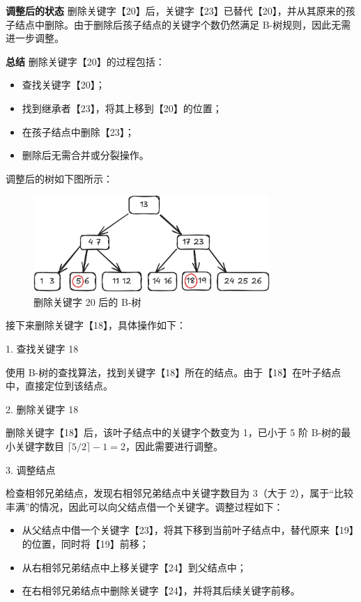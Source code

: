 \documentclass[lang=cn,newtx,10pt,scheme=chinese]{../elegantbook}
\begin{document}
     
     \textbf{调整后的状态}  
     删除关键字【20】后，关键字【23】已替代【20】，并从其原来的孩子结点中删除。由于删除后孩子结点的关键字个数仍然满足 B-树规则，因此无需进一步调整。
     
     
     \textbf{总结}  
     删除关键字【20】的过程包括：
     \begin{itemize}
       \item 查找关键字【20】；
       \item 找到继承者【23】，将其上移到【20】的位置；
       \item 在孩子结点中删除【23】；
       \item 删除后无需合并或分裂操作。
     \end{itemize}

     调整后的树如下图所示：
     \begin{figure}[h!]
        
          \centering
          \includegraphics[width=0.8\textwidth]{./figure/pdf/cropped/Btree_del3.pdf}
          \caption{删除关键字 20 后的 B-树}
          \label{fig:Btree_delete_20}
     \end{figure}

     接下来删除关键字【18】，具体操作如下：

     1. 查找关键字 18  

        使用 B-树的查找算法，找到关键字【18】所在的结点。由于【18】在叶子结点中，直接定位到该结点。
     
     2. 删除关键字 18  

        删除关键字【18】后，该叶子结点中的关键字个数变为 1，已小于 5 阶 B-树的最小关键字数目 $\lceil 5/2 \rceil - 1 = 2$，因此需要进行调整。
     
     3. 调整结点  

        检查相邻兄弟结点，发现右相邻兄弟结点中关键字数目为 3（大于 2），属于“比较丰满”的情况，因此可以向父结点借一个关键字。调整过程如下：
        \begin{itemize}
          \item 从父结点中借一个关键字【23】，将其下移到当前叶子结点中，替代原来【19】的位置，同时将【19】前移；
          \item 从右相邻兄弟结点中上移关键字【24】到父结点中；
          \item 在右相邻兄弟结点中删除关键字【24】，并将其后续关键字前移。
        \end{itemize}
     
\end{document}

